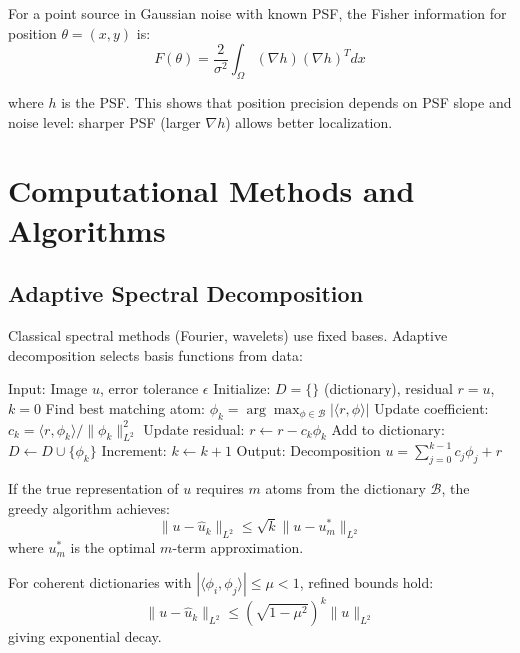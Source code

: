 \documentclass[twocolumn,11pt]{article}
\begin{document}
For a point source in Gaussian noise with known PSF, the Fisher information for position $\theta = (x, y)$ is:
\begin{equation}
F(\theta) = \frac{2}{\sigma^2} \int_\Omega (\nabla h)(\nabla h)^T dx
\end{equation}

where $h$ is the PSF. This shows that position precision depends on PSF slope and noise level: sharper PSF (larger $\nabla h$) allows better localization.

\section{Computational Methods and Algorithms}

\subsection{Adaptive Spectral Decomposition}

Classical spectral methods (Fourier, wavelets) use fixed bases. Adaptive decomposition selects basis functions from data:

\begin{algorithm}
\caption{Adaptive Spectral Decomposition with Greedy Selection}
\begin{algorithmic}[1]
\State Input: Image $u$, error tolerance $\epsilon$
\State Initialize: $D = \{\}$ (dictionary), residual $r = u$, $k = 0$
  \State Find best matching atom: $\phi_k = \arg\max_{\phi \in \mathcal{B}} |\langle r, \phi \rangle|$
  \State Update coefficient: $c_k = \langle r, \phi_k \rangle / \|\phi_k\|_{L^2}^2$
  \State Update residual: $r \leftarrow r - c_k \phi_k$
  \State Add to dictionary: $D \leftarrow D \cup \{\phi_k\}$
  \State Increment: $k \leftarrow k + 1$
\EndWhile
\State Output: Decomposition $u = \sum_{j=0}^{k-1} c_j \phi_j + r$
\end{algorithmic}
\end{algorithm}

\begin{theorem}
If the true representation of $u$ requires $m$ atoms from the dictionary $\mathcal{B}$, the greedy algorithm achieves:
\begin{equation}
\|u - \hat{u}_k\|_{L^2} \leq \sqrt{k} \|u - u_m^*\|_{L^2}
\end{equation}
where $u_m^*$ is the optimal $m$-term approximation.

For coherent dictionaries with $|\langle \phi_i, \phi_j \rangle| \leq \mu < 1$, refined bounds hold:
\begin{equation}
\|u - \hat{u}_k\|_{L^2} \leq \left(\sqrt{1-\mu^2}\right)^k \|u\|_{L^2}
\end{equation}
giving exponential decay.
\end{theorem}
\end{document}
